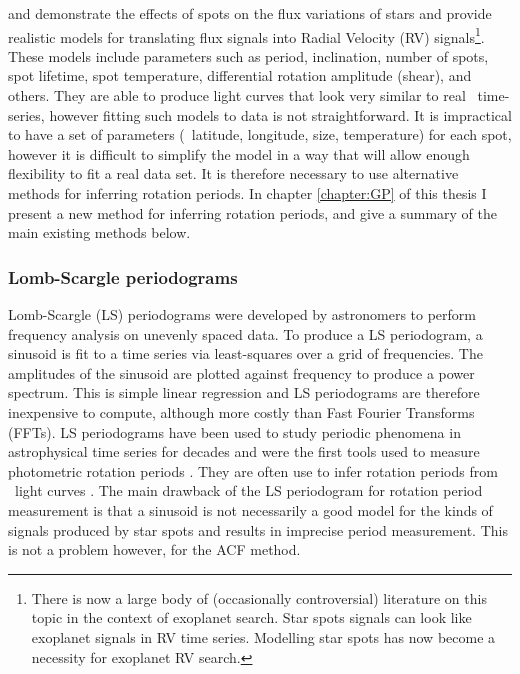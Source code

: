\citet{Aigrain2012} and \citet{Dumusque2014} demonstrate the effects of spots
on the flux variations of stars and provide realistic models for translating
flux signals into Radial Velocity (RV) signals\footnote{There is now a large
body of (occasionally controversial) literature on this topic in the context
of exoplanet search.
Star spots signals can look like exoplanet signals in RV time series.
Modelling star spots has now become a necessity for exoplanet RV search.}.
These models include parameters such as period, inclination, number of spots,
spot lifetime, spot temperature, differential rotation amplitude (shear), and
others.
They are able to produce light curves that look very similar to real \kepler\
time-series, however fitting such models to data is not straightforward.
It is impractical to have a set of parameters (\eg\ latitude, longitude, size,
temperature) for each spot, however it is difficult to simplify the model in a
way that will allow enough flexibility to fit a real data set.
It is therefore necessary to use alternative methods for inferring rotation
periods.
In chapter \ref{chapter:GP} of this thesis I present a new method for
inferring rotation periods, and give a summary of the main existing methods
below.

\subsubsection{Lomb-Scargle periodograms}
Lomb-Scargle (LS) periodograms \citep{Lomb1976, Scargle1982} were developed
by astronomers to perform frequency analysis on unevenly spaced data.
To produce a LS periodogram, a sinusoid is fit to a time series via
least-squares over a grid of frequencies.
The amplitudes of the sinusoid are plotted against frequency to produce a
power spectrum.
This is simple linear regression and LS periodograms are therefore
inexpensive to compute, although more costly than Fast Fourier Transforms
(FFTs).
LS periodograms have been used to study periodic phenomena in astrophysical
time series for decades and were the first tools used to measure photometric
rotation periods \citep[\eg][]{Scott1992, Mottola1995}.
They are often use to infer rotation periods from \kepler\ light curves
\citep[\eg][]{Reinhold2013, Reinhold2013b}.
The main drawback of the LS periodogram for rotation period measurement is
that a sinusoid is not necessarily a good model for the kinds of signals
produced by star spots and results in imprecise period measurement.
This is not a problem however, for the ACF method.


